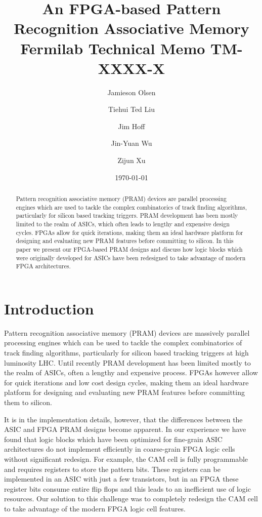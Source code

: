 \documentclass[letterpaper]{article}
\title{An FPGA-based Pattern Recognition Associative Memory
\\Fermilab Technical Memo TM-XXXX-X}
\author[1]{Jamieson Olsen}
\author[1]{Tiehui Ted Liu}
\author[1]{Jim Hoff}
\author[1]{Jin-Yuan Wu}
\author[1,2]{Zijun Xu}
\affil[1]{Fermi National Accelerator Laboratory\footnote{Operated by Fermi Research Alliance, LLC under Contract No. DE-AC02-07CH11359 with the United States Department of Energy.}, Batavia, Illinois USA}
\affil[2]{Peking University, Peking CHINA}
\date{\today}
\begin{document}
\maketitle

\begin{abstract}
\noindent Pattern recognition associative memory (PRAM) devices are parallel processing engines which are used to tackle the complex combinatorics of track finding algorithms, particularly for silicon based tracking triggers. PRAM development has been mostly limited to the realm of ASICs, which often leads to lengthy and expensive design cycles. FPGAs allow for quick iterations, making them an ideal hardware platform for designing and evaluating new PRAM features before committing to silicon. In this paper we present our FPGA-based PRAM designs and discuss how logic blocks which were originally developed for ASICs have been redesigned to take advantage of modern FPGA architectures.
\end{abstract}

\newpage
\tableofcontents
\listoffigures
\listoftables

\newpage

\section{Introduction}

Pattern recognition associative memory (PRAM) devices are massively parallel processing engines which can be used to tackle the complex combinatorics of track finding algorithms, particularly for silicon based tracking triggers at high luminosity LHC. Until recently PRAM development has been limited mostly to the realm of ASICs, often a lengthy and expensive process. FPGAs however allow for quick iterations and low cost design cycles, making them an ideal hardware platform for 
designing and evaluating new PRAM features before committing them to silicon. 

It is in the implementation details, however, that the differences between the ASIC and FPGA PRAM designs become apparent. In our experience we have found that logic blocks which have been optimized for fine-grain ASIC architectures do not implement efficiently in coarse-grain FPGA logic cells without significant redesign. For example, the CAM cell is fully programmable and requires registers to store the pattern bits. These registers can be implemented in an ASIC with just a few transistors, but in an FPGA these register bits consume entire flip flops and this leads to an inefficient use of logic resources. Our solution to this challenge was to completely redesign the CAM cell to take advantage of the modern FPGA logic cell features.
\end{document}

